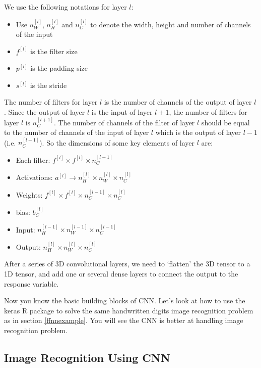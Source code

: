 \documentclass[12pt,]{krantz}
\providecommand{\tightlist}{%
  \setlength{\itemsep}{0pt}\setlength{\parskip}{0pt}}
\begin{document}
We use the following notations for layer \(l\):

\begin{itemize}
\tightlist
\item
  Use \(n_W^{[l]}\), \(n_H^{[l]}\) and \(n_C^{[l]}\) to denote the width, height and number of channels of the input
\item
  \(f^{[l]}\) is the filter size
\item
  \(p^{[l]}\) is the padding size
\item
  \(s^{[l]}\) is the stride
\end{itemize}

The number of filters for layer \(l\) is the number of channels of the output of layer \(l\). Since the output of layer \(l\) is the input of layer \(l+1\), the number of filters for layer \(l\) is \(n_C^{[l+1]}\). The number of channels of the filter of layer \(l\) should be equal to the number of channels of the input of layer \(l\) which is the output of layer \(l-1\) (i.e. \(n_C^{[l-1]}\)). So the dimensions of some key elements of layer \(l\) are:

\begin{itemize}
\tightlist
\item
  Each filter: \(f^{[l]} \times f^{[l]} \times n^{[l-1]}_C\)
\item
  Activations: \(a^{[l]} \rightarrow n_H^{[l]} \times n_W^{[l]} \times n_C^{[l]}\)
\item
  Weights: \(f^{[l]} \times f^{[l]} \times n^{[l-1]}_C \times n^{[l]}_C\)
\item
  bias: \(b^{[l]}_C\)
\item
  Input: \(n^{[l-1]}_H \times n^{[l-1]}_W \times n^{[l-1]}_C\)
\item
  Output: \(n^{[l]}_H \times n^{[l]}_W \times n^{[l]}_C\)
\end{itemize}

After a series of 3D convolutional layers, we need to `flatten' the 3D tensor to a 1D tensor, and add one or several dense layers to connect the output to the response variable.

Now you know the basic building blocks of CNN. Let's look at how to use the keras R package to solve the same handwritten digits image recognition problem as in section \ref{ffnnexample}. You will see the CNN is better at handling image recognition problem.

\hypertarget{cnnexample}{%
\subsection{Image Recognition Using CNN}\label{cnnexample}}
\end{document}
